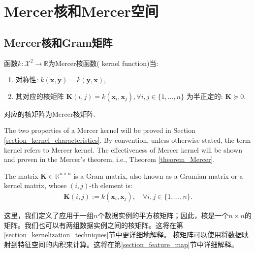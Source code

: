\documentclass[lang=cn,10pt]{gorgeousnbook}
\numberwithin{equation}{section}%
\numberwithin{figure}{section}%
\begin{document}
\section{Mercer核和Mercer空间}\label{section_Mercer_kernel_and_spaces}

\subsection{Mercer核和Gram矩阵}

\begin{definition} \label{definition_Mercer_kernel}
函数$k: \mathcal{X}^2 \rightarrow \mathbb{R}$为Mercer核函数( kernel function)当:

\begin{enumerate}[topsep=0pt,itemsep=-1ex,partopsep=1ex,parsep=1ex]
\item 对称性: $k(\boldsymbol{x}, \boldsymbol{y}) = k(\boldsymbol{y}, \boldsymbol{x})$,
\item 其对应的核矩阵 $\boldsymbol{K}(i,j) = k(\boldsymbol{x}_i, \boldsymbol{x}_j), \forall i,j \in \{1, \dots, n\}$ 为半正定的: $\boldsymbol{K} \succeq 0$. 
\end{enumerate}
对应的核矩阵为Mercer核矩阵. 
\end{definition}

The two properties of a Mercer kernel will be proved in Section \ref{section_kernel_characteristics}.
By convention, unless otherwise stated, the term kernel refers to Mercer kernel. 
The effectiveness of Mercer kernel will be shown and proven in the Mercer's theorem, i.e., Theorem \ref{theorem_Mercer}.

\begin{definition}\label{definition_Gram_matrix}
The matrix $\boldsymbol{K} \in \mathbb{R}^{n \times n}$ is a Gram matrix, also known as a Gramian matrix or a kernel matrix, whose $(i,j)$-th element is:
\begin{align}\label{equation_Gram_matrix}
\boldsymbol{K}(i,j) := k(\boldsymbol{x}_i, \boldsymbol{x}_j), \quad \forall i,j \in \{1, \dots, n\}.
\end{align}
\end{definition}
这里，我们定义了应用于一组$n$个数据实例的平方核矩阵；因此，核是一个$n \times n$的矩阵。我们也可以有两组数据实例之间的核矩阵。这将在第\ref{section_kernelization_techniques}节中更详细地解释。
核矩阵可以使用将数据映射到特征空间的内积来计算。这将在第\ref{section_feature_map}节中详细解释。
\end{document}
